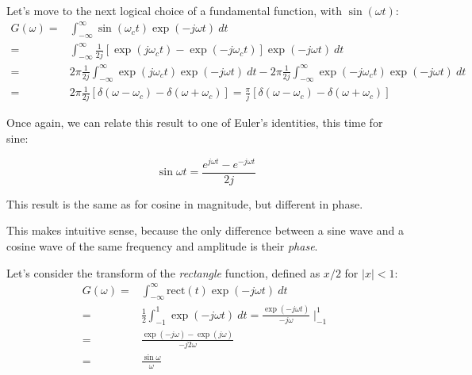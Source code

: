 \documentclass[11pt]{report}
\begin{document}
Let's move to the next logical choice of a fundamental function, with $\sin(\omega t)$:
\begin{equation}
\begin{split}
G(\omega) =& \int^{\infty}_{-\infty}\sin(\omega_c t)\exp(-j\omega t)~dt\\
=& \int^{\infty}_{-\infty}\frac{1}{2j}[\exp(j\omega_c t)-\exp(-j\omega_c
t)]\exp(-j\omega t)~dt\\
=& 2\pi\frac{1}{2j}\int^{\infty}_{-\infty}\exp(j\omega_c t)\exp(-j\omega
t)~dt - 2\pi\frac{1}{2j}\int^{\infty}_{-\infty}\exp(-j\omega_c t)\exp(-j\omega
t)~dt\\
=& 2\pi\frac{1}{2j}[\delta(\omega-\omega_c)-\delta(\omega+\omega_c)] =
\frac{\pi}{j}[\delta(\omega-\omega_c)-\delta(\omega+\omega_c)]
\end{split}
\end{equation}

Once again, we can relate this result to one of Euler's identities,
this time for sine:

\begin{equation*}
\sin \omega t = \frac{e^{j \omega t} - e^{-j \omega t}}{2j}
\end{equation*}

This result is the same as for cosine in magnitude, but different in
phase.  

This makes intuitive sense, because the only difference between a sine
wave and a cosine wave of the same frequency and amplitude is their
\textit{phase}.


Let's consider the transform of the \textit{rectangle} function, defined
as $x/2$ for $|x|<1$:
\begin{equation}
\begin{split}
G(\omega) =& \int^{\infty}_{-\infty}\text{rect}(t)\exp(-j\omega t)~dt\\
=& \frac{1}{2}\int^{1}_{-1}\exp(-j\omega t)~dt = 
\frac{\exp(-j\omega t)}{-j\omega}\mid^{1}_{-1}\\
=& \frac{\exp(-j\omega)-\exp(j\omega)}{-j2\omega}\\
=& \frac{\sin\omega}{\omega}
\end{split}
\end{equation}
\end{document}
